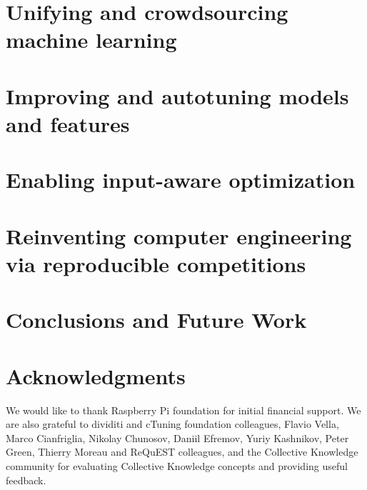 \documentclass[10pt,letterpaper,twocolumn]{article}
\begin{document}
\section{Unifying and crowdsourcing machine learning}
\label{sec:crowdmodeling}


\section{Improving and autotuning models and features}
\label{sec:features}


\section{Enabling input-aware optimization}
\label{sec:datasets}


\section{Reinventing computer engineering via reproducible competitions}
\label{sec:competitions}


\section{Conclusions and Future Work}
\label{sec:conclusions}


\section{Acknowledgments}
\label{sec:ack}

We would like to thank Raspberry Pi foundation for initial financial support.
We are also grateful to dividiti and cTuning foundation colleagues, 
Flavio Vella, Marco Cianfriglia, Nikolay Chunosov, Daniil Efremov, Yuriy Kashnikov, 
Peter Green, Thierry Moreau and ReQuEST colleagues, and the Collective Knowledge community 
for evaluating Collective Knowledge concepts and providing useful feedback.
\end{document}
